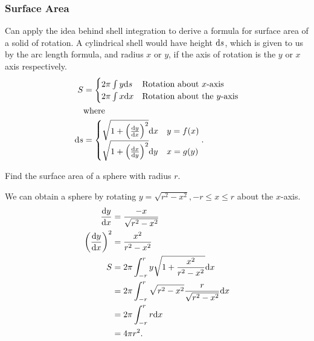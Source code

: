 \subsubsection{Surface Area}
Can apply the idea behind shell integration to derive a formula for surface area of a solid of rotation.
A cylindrical shell would have height $\mathrm{d} s$, which is given to us by the arc length formula, and radius $x$ or $y$, if the axis of rotation is the $y$ or $x$ axis respectively.
\begin{align*}
	S &= \begin{cases}
		2\pi\int{y\mathrm{d} s} & \text{Rotation about $x$-axis} \\
		2\pi\int{x\mathrm{d} x} & \text{Rotation about the $y$-axis}
	\end{cases} \\
	& \text{where } \\
	\mathrm{d} s &= \begin{cases}
		\sqrt{1+\left(\frac{\mathrm{d} y}{\mathrm{d} x}\right)^2}\mathrm{d} x & y=f(x) \\
		\sqrt{1+\left(\frac{\mathrm{d} x}{\mathrm{d} y}\right)^2}\mathrm{d} y & x=g(y) \\
	\end{cases}.
\end{align*}

\begin{example}
	Find the surface area of a sphere with radius $r$.
\end{example}
\begin{answer}
	We can obtain a sphere by rotating $y=\sqrt{r^2-x^2}, -r\leq x\leq r$ about the $x$-axis.
	\begin{align*}
		\frac{\mathrm{d} y}{\mathrm{d} x} &= \frac{-x}{\sqrt{r^2-x^2}} \\
		\left(\frac{\mathrm{d} y}{\mathrm{d} x}\right)^2 &= \frac{x^2}{r^2-x^2} \\
		S &= 2\pi\int_{-r}^{r}{y\sqrt{1+\frac{x^2}{r^2-x^2}}\mathrm{d} x} \\
		&= 2\pi\int_{-r}^{r}{\sqrt{r^2-x^2}\frac{r}{\sqrt{r^2-x^2}}\mathrm{d} x} \\
		&= 2\pi\int_{-r}^{r}{r\mathrm{d} x} \\
		&= 4\pi r^2.
	\end{align*}
\end{answer}